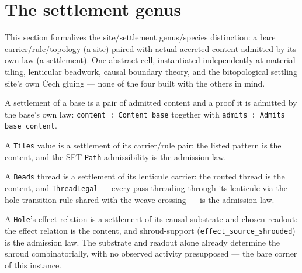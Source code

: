 \section{The settlement genus}

This section formalizes the site/settlement genus/species distinction: a bare
carrier/rule/topology (a site) paired with actual accreted content admitted by
its own law (a settlement). One abstract cell, instantiated independently at
material tiling, lenticular beadwork, causal boundary theory, and the
bitopological settling site's own \v{C}ech gluing --- none of the four built
with the others in mind.

\begin{definition}[Settlement]\label{def:settlement}\leanok
A settlement of a base is a pair of admitted content and a proof it is
admitted by the base's own law: \texttt{content : Content base} together
with \texttt{admits : Admits base content}.
\end{definition}

\begin{theorem}\label{thm:settlement-of-tiles}\leanok{}
A \texttt{Tiles} value is a settlement of its carrier/rule pair: the listed
pattern is the content, and the SFT \texttt{Path} admissibility is the
admission law.
\end{theorem}

\begin{theorem}\label{thm:settlement-of-beads-thread}\leanok{}
A \texttt{Beads} thread is a settlement of its lenticule carrier: the routed
thread is the content, and \texttt{ThreadLegal} --- every pass threading
through its lenticule via the hole-transition rule shared with the weave
crossing --- is the admission law.
\end{theorem}

\begin{theorem}\label{thm:settlement-of-hole}\leanok{}
A \texttt{Hole}'s effect relation is a settlement of its causal substrate and
chosen readout: the effect relation is the content, and shroud-support
(\texttt{effect\_source\_shrouded}) is the admission law. The substrate and
readout alone already determine the shroud combinatorially, with no observed
activity presupposed --- the bare corner of this instance.
\end{theorem}

